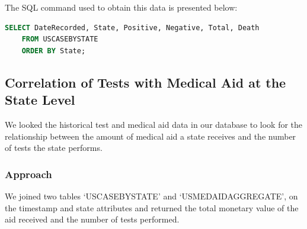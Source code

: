 \documentclass[11pt]{article}
\begin{document}
\noindent
The SQL command used to obtain this data is presented below:
\begin{lstlisting}[language=SQL,
        deletekeywords={IDENTITY,INT},
        morekeywords={clustered},    
        framesep=10pt,
        framextopmargin=10pt]
    SELECT DateRecorded, State, Positive, Negative, Total, Death 
    FROM USCASEBYSTATE
    ORDER BY State;\end{lstlisting}
    
\pagebreak

\subsection{Correlation of Tests with Medical Aid at the State Level}
\noindent
We looked the historical test and medical aid data in our database to look for the relationship between the amount of medical aid a state receives and the number of tests the state performs. 

\subsubsection{Approach}
We joined two tables `USCASEBYSTATE' and `USMEDAIDAGGREGATE', on the timestamp and state attributes and returned the total monetary value of the aid received and the number of tests performed. 


\end{document}
